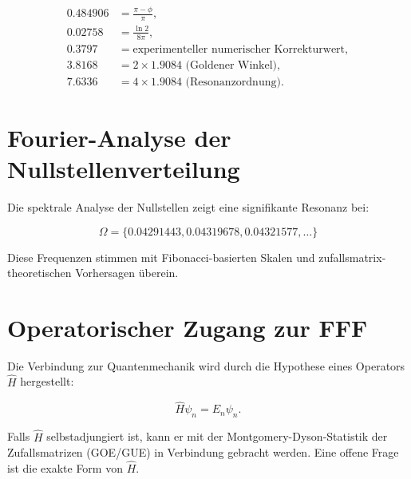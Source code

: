 \documentclass[a4paper,12pt]{article}
\begin{document}
\begin{align}
0.484906 &= \frac{\pi - \phi}{\pi}, \\
0.02758 &= \frac{\ln 2}{8\pi}, \\
0.3797 &= \text{experimenteller numerischer Korrekturwert}, \\
3.8168 &= 2 \times 1.9084 \text{ (Goldener Winkel)}, \\
7.6336 &= 4 \times 1.9084 \text{ (Resonanzordnung)}.
\end{align}

\section{Fourier-Analyse der Nullstellenverteilung}
Die spektrale Analyse der Nullstellen zeigt eine signifikante Resonanz bei:

\begin{equation}
\Omega = \{0.04291443, 0.04319678, 0.04321577, \dots\}
\end{equation}

Diese Frequenzen stimmen mit Fibonacci-basierten Skalen und zufallsmatrix-theoretischen Vorhersagen überein.

\section{Operatorischer Zugang zur FFF}
Die Verbindung zur Quantenmechanik wird durch die Hypothese eines Operators $\hat{H}$ hergestellt:

\begin{equation}
\hat{H} \psi_n = E_n \psi_n.
\end{equation}

Falls $\hat{H}$ selbstadjungiert ist, kann er mit der Montgomery-Dyson-Statistik der Zufallsmatrizen (GOE/GUE) in Verbindung gebracht werden. Eine offene Frage ist die exakte Form von $\hat{H}$.
\end{document}
